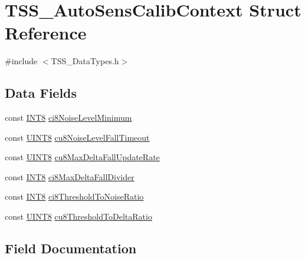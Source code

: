 \hypertarget{struct_t_s_s___auto_sens_calib_context}{}\section{T\+S\+S\+\_\+\+Auto\+Sens\+Calib\+Context Struct Reference}
\label{struct_t_s_s___auto_sens_calib_context}


{\ttfamily \#include $<$T\+S\+S\+\_\+\+Data\+Types.\+h$>$}

\subsection*{Data Fields}
\begin{DoxyCompactItemize}
\item 
const \hyperlink{_t_s_s___data_types_8h_a7ebe70ceca856797319175e30bcf003d}{I\+N\+T8} \hyperlink{struct_t_s_s___auto_sens_calib_context_a9b8473a0a47fbaaef7a46c19e6f2be45}{ci8\+Noise\+Level\+Minimum}
\item 
const \hyperlink{_t_s_s___data_types_8h_ab27e9918b538ce9d8ca692479b375b6a}{U\+I\+N\+T8} \hyperlink{struct_t_s_s___auto_sens_calib_context_a2eb1ffb69158e0ac8f1cdcb91e592bef}{cu8\+Noise\+Level\+Fall\+Timeout}
\item 
const \hyperlink{_t_s_s___data_types_8h_ab27e9918b538ce9d8ca692479b375b6a}{U\+I\+N\+T8} \hyperlink{struct_t_s_s___auto_sens_calib_context_a847ad663f155ede108bb83d907bdf10b}{cu8\+Max\+Delta\+Fall\+Update\+Rate}
\item 
const \hyperlink{_t_s_s___data_types_8h_a7ebe70ceca856797319175e30bcf003d}{I\+N\+T8} \hyperlink{struct_t_s_s___auto_sens_calib_context_a2abf94b7499429249e69e34481ca6639}{ci8\+Max\+Delta\+Fall\+Divider}
\item 
const \hyperlink{_t_s_s___data_types_8h_a7ebe70ceca856797319175e30bcf003d}{I\+N\+T8} \hyperlink{struct_t_s_s___auto_sens_calib_context_a2141d857b4da568c1eca75784f8be6e8}{ci8\+Threshold\+To\+Noise\+Ratio}
\item 
const \hyperlink{_t_s_s___data_types_8h_ab27e9918b538ce9d8ca692479b375b6a}{U\+I\+N\+T8} \hyperlink{struct_t_s_s___auto_sens_calib_context_a6517f408af4750e50a87e8080b3ccabd}{cu8\+Threshold\+To\+Delta\+Ratio}
\end{DoxyCompactItemize}


\subsection{Field Documentation}
\mbox{\label{struct_t_s_s___auto_sens_calib_context_a2abf94b7499429249e69e34481ca6639}} 
